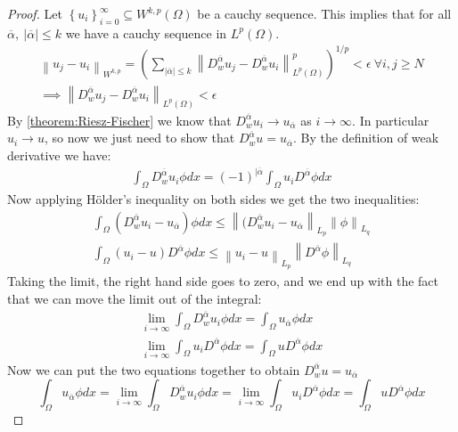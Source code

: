 \documentclass[../Main/main.tex]{subfiles}
\begin{document}
	\begin{proof}
		Let $\left \{  u_i\right \}_{i=0}^{\infty} \subseteq W^{k,p}(\Omega)$ be a cauchy sequence. This implies that for all $\overline{\alpha}, \  |\overline{\alpha}| \leq k$ we have a cauchy sequence in $L^p(\Omega)$.
		\begin{gather*}
			\left \| u_j -u_i \right \|_{W^{k,p}} =
			(\sum_{|\overline{\alpha}|\leq k} \left \| D_w^{\overline{\alpha}}u_j - D_w^{\overline{\alpha}}u_i \right \|_{L^p(\Omega)}^p)^{1/p}  < \epsilon \ \forall i,j \geq N \\
			\implies \left \| D_w^{\overline{\alpha}}u_j - D_w^{\overline{\alpha}}u_i \right \|_{L^p(\Omega)} < \epsilon
		\end{gather*}
		By \eqref{theorem:Riesz-Fischer} we know that $D_w^{\overline{\alpha}}u_i \rightarrow u_{\overline{\alpha}}$ as $i\rightarrow  \infty$. In particular $u_i \rightarrow u$, so now we just need to show that $D_w^{\overline{\alpha}}u =  u_{\overline{\alpha}}$. By the definition of weak derivative we have:
		\begin{gather*}
			\int_{\Omega} D_w^{\overline{\alpha}}u_i \phi dx = (-1)^{|\overline{\alpha}} \int_{\Omega} u_i D^{\overline{\alpha}}\phi dx
		\end{gather*}
		Now applying Hölder's inequality on both sides we get the two inequalities:
		\begin{gather*}
			\int_{\Omega} (D_w^{\overline{\alpha}}u_i - u_{\overline{\alpha}}) \phi dx \leq \left \| (D_w^{\overline{\alpha}}u_i - u_{\overline{\alpha}} \right \|_{L_p} \left \| \phi \right \|_{L_q} \\
			\int_{\Omega} (u_i -u) D^{\overline{\alpha}}\phi dx \leq \left \|u_i -u  \right \|_{L_p} \left \| D^{\overline{\alpha}}\phi \right \|_{L_q}
		\end{gather*}
		Taking the limit, the right hand side goes to zero, and we end up with the fact that we can move the limit out of the integral:
		\begin{gather*}
			\lim_{i\rightarrow \infty} \int_{\Omega} D_w^{\overline{\alpha}}u_i \phi dx =  \int_{\Omega}u_{\overline{\alpha}} \phi dx \\
			\lim_{i\rightarrow \infty}\int_{\Omega} u_i D^{\overline{\alpha}}\phi dx = \int_{\Omega} u  D^{\overline{\alpha}}\phi dx
		\end{gather*}
		Now we can put the two equations together to obtain $D_w^{\overline{\alpha}}u =  u_{\overline{\alpha}}$
		\begin{equation*}
			\int_{\Omega}u_{\overline{\alpha}} \phi dx = \lim_{i\rightarrow \infty} \int_{\Omega} D_w^{\overline{\alpha}}u_i \phi dx = \lim_{i\rightarrow \infty}\int_{\Omega} u_i D^{\overline{\alpha}}\phi dx = \int_{\Omega} u  D^{\overline{\alpha}}\phi dx
		\end{equation*}
	\end{proof}
\end{document}

